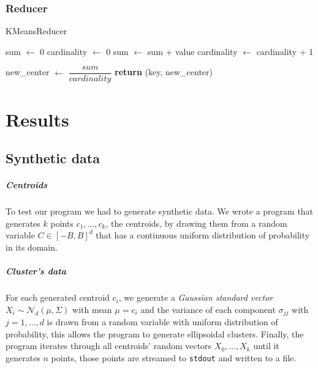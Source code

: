 \documentclass[parskip=full]{report}
\begin{document}
\subsection{Reducer}

\begin{algorithm}
	\caption{KMeansReducer}\label{algo:kmeans-reducer}
	\begin{algorithmic}[1]
		\State sum $\gets$ 0
		\State cardinality $\gets$ 0
		\State sum $\gets$ sum + value
		\State cardinality $\gets$ cardinality + 1
		\EndFor

		\State new\_center $\gets$  $\dfrac{sum}{cardinality}$
		\State \textbf{return} (key, new\_center)
		\EndProcedure
	\end{algorithmic}
\end{algorithm}

\chapter{Results}

\section{Synthetic data}

\paragraph{Centroids}
To test our program we had to generate synthetic data. We wrote a program that 
generates $k$ points $c_1, \dots, c_k$, the centroids, by drawing them from a 
random variable 
$C \in \left[-B,B\right]^d$ that has a continuous uniform distribution of 
probability in its domain. 

\paragraph{Cluster's data}
For each generated centroid $c_i$, we generate a \emph{Gaussian standard 
vector} $X_i \sim \mathcal{N}_d(\mu, \Sigma)$ with mean $\mu = c_i$ and the 
variance of each component 
$\sigma_{jj}$ with $j = 1, \dots, d$ is 
drawn from a random variable with uniform distribution of probability, this 
allows the program to generate ellipsoidal clusters. Finally, the program 
iterates through all centroids' random vectors $X_0, ..., X_k$ until it 
generates $n$ points, those points are streamed to \texttt{stdout} and written 
to a file.
\end{document}
